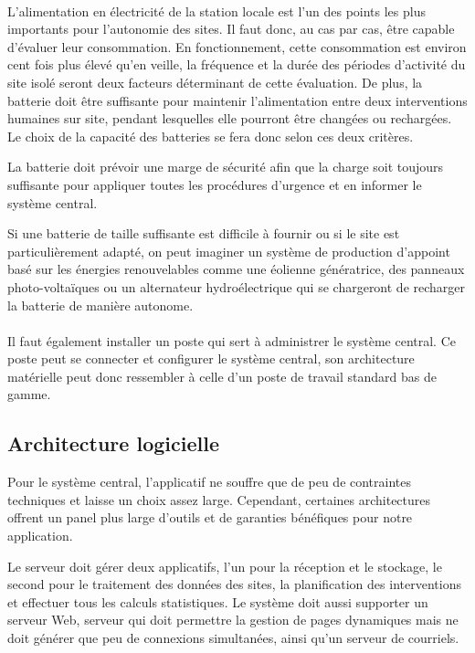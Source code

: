 \documentclass[a4paper, 11pt, final]{article}
\begin{document}
\paragraph{}
L'alimentation en électricité de la station locale est l'un des points
les plus importants pour l'autonomie des sites. Il faut donc, au cas
par cas, être capable d'évaluer leur consommation. En fonctionnement,
cette consommation est environ cent fois plus élevé qu'en veille,
la fréquence et la durée des périodes d'activité du site isolé seront deux
facteurs déterminant de cette évaluation. De plus, la batterie doit être
suffisante pour maintenir l'alimentation entre deux interventions humaines
sur site, pendant lesquelles elle pourront être changées ou rechargées.
Le choix de la capacité des batteries se fera donc selon ces deux critères.

La batterie doit prévoir une marge de sécurité afin que la charge soit
toujours suffisante pour appliquer toutes les procédures d'urgence et en
informer le système central.

Si une batterie de taille suffisante est difficile à fournir ou si le site
est particulièrement adapté, on peut imaginer un système de production
d'appoint basé sur les énergies renouvelables comme une éolienne génératrice,
des panneaux photo-voltaïques ou un alternateur hydroélectrique qui se chargeront
de recharger la batterie de manière autonome.

\paragraph{}
Il faut également installer un poste qui sert à administrer le système
central. Ce poste peut se connecter et configurer le système central,
son architecture matérielle peut donc ressembler à celle d'un poste de
travail standard bas de gamme.

\subsection{Architecture logicielle}
Pour le système central, l'applicatif ne souffre que de peu de
contraintes techniques et laisse un choix assez large. Cependant,
certaines architectures offrent un panel plus large d'outils et de
garanties bénéfiques pour notre application.

Le serveur doit gérer deux applicatifs, l'un pour la réception et le
stockage, le second pour le traitement des données des sites, la
planification des interventions et effectuer tous les calculs
statistiques. Le système doit aussi supporter un serveur Web, serveur
qui doit permettre la gestion de pages dynamiques mais ne doit générer
que peu de connexions simultanées, ainsi qu'un serveur de courriels.
\end{document}
